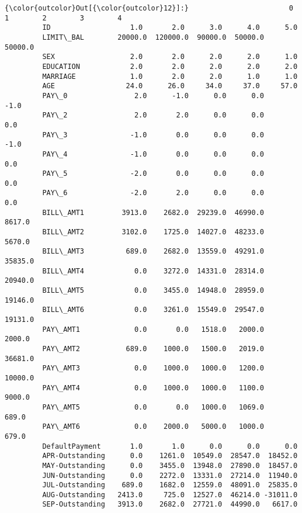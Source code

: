 \documentclass[11pt]{article}
\begin{document}
\begin{Verbatim}[commandchars=\\\{\}]
{\color{outcolor}Out[{\color{outcolor}12}]:}                        0         1        2        3        4
         ID                   1.0       2.0      3.0      4.0      5.0
         LIMIT\_BAL        20000.0  120000.0  90000.0  50000.0  50000.0
         SEX                  2.0       2.0      2.0      2.0      1.0
         EDUCATION            2.0       2.0      2.0      2.0      2.0
         MARRIAGE             1.0       2.0      2.0      1.0      1.0
         AGE                 24.0      26.0     34.0     37.0     57.0
         PAY\_0                2.0      -1.0      0.0      0.0     -1.0
         PAY\_2                2.0       2.0      0.0      0.0      0.0
         PAY\_3               -1.0       0.0      0.0      0.0     -1.0
         PAY\_4               -1.0       0.0      0.0      0.0      0.0
         PAY\_5               -2.0       0.0      0.0      0.0      0.0
         PAY\_6               -2.0       2.0      0.0      0.0      0.0
         BILL\_AMT1         3913.0    2682.0  29239.0  46990.0   8617.0
         BILL\_AMT2         3102.0    1725.0  14027.0  48233.0   5670.0
         BILL\_AMT3          689.0    2682.0  13559.0  49291.0  35835.0
         BILL\_AMT4            0.0    3272.0  14331.0  28314.0  20940.0
         BILL\_AMT5            0.0    3455.0  14948.0  28959.0  19146.0
         BILL\_AMT6            0.0    3261.0  15549.0  29547.0  19131.0
         PAY\_AMT1             0.0       0.0   1518.0   2000.0   2000.0
         PAY\_AMT2           689.0    1000.0   1500.0   2019.0  36681.0
         PAY\_AMT3             0.0    1000.0   1000.0   1200.0  10000.0
         PAY\_AMT4             0.0    1000.0   1000.0   1100.0   9000.0
         PAY\_AMT5             0.0       0.0   1000.0   1069.0    689.0
         PAY\_AMT6             0.0    2000.0   5000.0   1000.0    679.0
         DefaultPayment       1.0       1.0      0.0      0.0      0.0
         APR-Outstanding      0.0    1261.0  10549.0  28547.0  18452.0
         MAY-Outstanding      0.0    3455.0  13948.0  27890.0  18457.0
         JUN-Outstanding      0.0    2272.0  13331.0  27214.0  11940.0
         JUL-Outstanding    689.0    1682.0  12559.0  48091.0  25835.0
         AUG-Outstanding   2413.0     725.0  12527.0  46214.0 -31011.0
         SEP-Outstanding   3913.0    2682.0  27721.0  44990.0   6617.0
\end{Verbatim}
            
\end{document}

